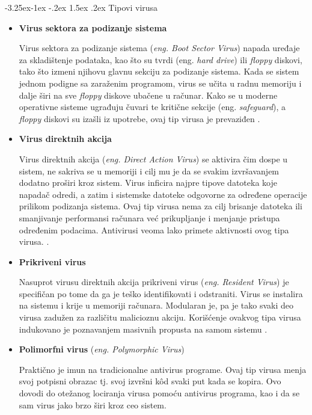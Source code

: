 \documentclass[a4paper]{article}
\makeatletter
\renewcommand\paragraph{\@startsection{paragraph}{4}{\z@}%
   {-3.25ex\@plus -1ex \@minus -.2ex}%
   {1.5ex \@plus .2ex}%
   {\normalfont\normalsize\bfseries}}
\makeatother
\begin{document}
\paragraph{Tipovi virusa}
\begin{itemize}
\item \textbf{Virus sektora za podizanje sistema}

Virus sektora za podizanje sistema (\textit{eng. Boot Sector Virus}) napada uređaje za skladištenje podataka, kao što su tvrdi (eng. \textit{hard drive}) ili \textit{floppy} diskovi, tako što izmeni njihovu glavnu sekciju za podizanje sistema. Kada se sistem jednom podigne sa zaraženim programom, virus se učita u radnu memoriju i dalje širi na sve \textit{floppy} diskove ubačene u računar. Kako se u moderne operativne sisteme ugrađuju čuvari te kritične sekcije (eng. \textit{safeguard}), a \textit{floppy} diskovi su izašli iz upotrebe, ovaj tip virusa je prevaziđen \cite{viruses_and_worms, computer_virus}.


\item \textbf{Virus direktnih akcija}

Virus direktnih akcija (\textit{eng. Direct Action Virus}) se aktivira čim dospe u sistem, ne sakriva se u memoriji i cilj mu je da se svakim izvršavanjem dodatno proširi kroz sistem. Virus inficira najpre tipove datoteka koje napadač odredi, a zatim i sistemske datoteke odgovorne za određene operacije prilikom podizanja sistema. Ovaj tip virusa nema za cilj brisanje datoteka ili smanjivanje performansi računara već prikupljanje i menjanje pristupa određenim podacima. Antivirusi veoma lako primete aktivnosti ovog tipa virusa. \cite{directaction}.


\item \textbf{Prikriveni virus}

Nasuprot virusu direktnih akcija prikriveni virus (\textit{eng. Resident Virus}) je specifičan po tome da ga je teško identifikovati i odstraniti. Virus se instalira na sistemu i krije u memoriji računara. Modularan je, pa je tako svaki deo virusa zadužen za različitu malicioznu akciju. Korišćenje ovakvog tipa virusa indukovano je poznavanjem masivnih propusta na samom sistemu \cite{computer_virus}.

\item \textbf{Polimorfni virus} (\textit{eng. Polymorphic Virus})

Praktično je imun na tradicionalne antivirus programe. Ovaj tip virusa menja svoj potpisni obrazac tj. svoj izvršni kôd svaki put kada se kopira. Ovo dovodi do otežanog lociranja virusa pomoću antivirus programa, kao i da se sam virus jako brzo širi kroz ceo sistem.


\end{itemize}
\end{document}
